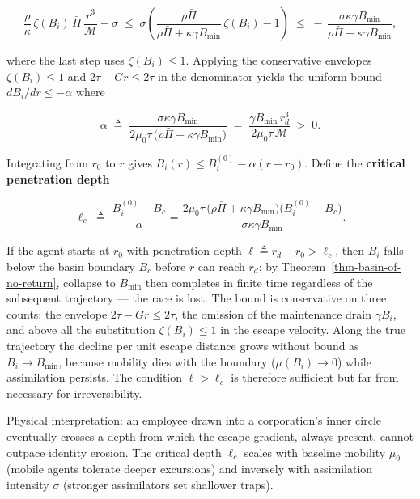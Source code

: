 \documentclass[11pt]{article}
\theoremstyle{plain}
\theoremstyle{definition}
\theoremstyle{remark}
\begin{document}
\[\frac{\rho}{\kappa}\,\zeta(B_i)\,\bar{\Pi}\,\frac{r^3}{\mathcal{M}} - \sigma \;\leq\; \sigma\left(\frac{\rho\bar{\Pi}}{\rho\bar{\Pi} + \kappa\gamma B_{\min}}\,\zeta(B_i) - 1\right) \;\leq\; -\,\frac{\sigma\kappa\gamma B_{\min}}{\rho\bar{\Pi} + \kappa\gamma B_{\min}},\]

where the last step uses \(\zeta(B_i) \leq 1\). Applying the
conservative envelopes \(\zeta(B_i) \leq 1\) and
\(2\tau - Gr \leq 2\tau\) in the denominator yields the uniform bound
\(dB_i/dr \leq -\alpha\) where

\[\alpha \;\triangleq\; \frac{\sigma\kappa\gamma B_{\min}}{2\mu_0\tau\,\bigl(\rho\bar{\Pi} + \kappa\gamma B_{\min}\bigr)} \;=\; \frac{\gamma B_{\min}\, r_d^3}{2\mu_0 \tau\, \mathcal{M}} \;>\; 0.\]

Integrating from \(r_0\) to \(r\) gives
\(B_i(r) \leq B_i^{(0)} - \alpha(r - r_0)\). Define the \textbf{critical
penetration depth}

\[\ell_c \;\triangleq\; \frac{B_i^{(0)} - B_c}{\alpha} = \frac{2\mu_0\tau\,\bigl(\rho\bar{\Pi} + \kappa\gamma B_{\min}\bigr)\bigl(B_i^{(0)} - B_c\bigr)}{\sigma\kappa\gamma B_{\min}}.\]

If the agent starts at \(r_0\) with penetration depth
\(\ell \triangleq r_d - r_0 > \ell_c\), then \(B_i\) falls below the
basin boundary \(B_c\) before \(r\) can reach \(r_d\); by
Theorem~\ref{thm-basin-of-no-return}, collapse to \(B_{\min}\) then
completes in finite time regardless of the subsequent trajectory --- the
race is lost. The bound is conservative on three counts: the envelope
\(2\tau - Gr \leq 2\tau\), the omission of the maintenance drain
\(\gamma B_i\), and above all the substitution \(\zeta(B_i) \leq 1\) in
the escape velocity. Along the true trajectory the decline per unit
escape distance grows without bound as \(B_i \to B_{\min}\), because
mobility dies with the boundary (\(\mu(B_i) \to 0\)) while assimilation
persists. The condition \(\ell > \ell_c\) is therefore sufficient but
far from necessary for irreversibility.

Physical interpretation: an employee drawn into a corporation's inner
circle eventually crosses a depth from which the escape gradient, always
present, cannot outpace identity erosion. The critical depth \(\ell_c\)
scales with baseline mobility \(\mu_0\) (mobile agents tolerate deeper
excursions) and inversely with assimilation intensity \(\sigma\)
(stronger assimilators set shallower traps).
\end{document}
